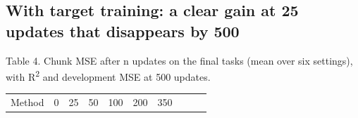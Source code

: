 \documentclass[11pt,a4paper]{article}
\begin{document}
\subsection{With target training: a clear gain at 25 updates that disappears by 500}


Table 4. Chunk MSE after n updates on the final tasks (mean over six settings), with R\textsuperscript{2} and development MSE at 500 updates.

{\def\LTcaptype{none} %
{\small
\begin{longtable}[]{@{}
  >{\raggedright\arraybackslash}p{}
  >{\raggedright\arraybackslash}p{}
  >{\raggedright\arraybackslash}p{}
  >{\raggedright\arraybackslash}p{}
  >{\raggedright\arraybackslash}p{}
  >{\raggedright\arraybackslash}p{}
  >{\raggedright\arraybackslash}p{}
  >{\raggedright\arraybackslash}p{}
  >{\raggedright\arraybackslash}p{}
  >{\raggedright\arraybackslash}p{}@{}}
\toprule\noalign{}
\begin{minipage}[b]{\linewidth}\raggedright
Method
\end{minipage} & \begin{minipage}[b]{\linewidth}\raggedright
0
\end{minipage} & \begin{minipage}[b]{\linewidth}\raggedright
25
\end{minipage} & \begin{minipage}[b]{\linewidth}\raggedright
50
\end{minipage} & \begin{minipage}[b]{\linewidth}\raggedright
100
\end{minipage} & \begin{minipage}[b]{\linewidth}\raggedright
200
\end{minipage} & \begin{minipage}[b]{\linewidth}\raggedright
350
\end{minipage} & \begin{minipage}[b]{\linewidth}\raggedright

\end{minipage}
\end{longtable}}}
\end{document}
